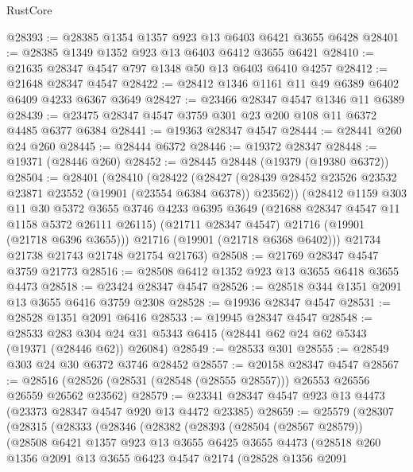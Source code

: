 \begin{lexlean}{RustCore}
\begin{coremodule}
@28393 := @28385 @1354 @1357 @923 @13 @6403 @6421 @3655 @6428
@28401 := @28385 @1349 @1352 @923 @13 @6403 @6412 @3655 @6421
@28410 := @21635 @28347 @4547 @797 @1348 @50 @13 @6403 @6410 @4257
@28412 := @21648 @28347 @4547
@28422 := @28412 @1346 @1161 @11 @49 @6389 @6402 @6409 @4233 @6367 @3649
@28427 := @23466 @28347 @4547 @1346 @11 @6389
@28439 := @23475 @28347 @4547 @3759 @301 @23 @200 @108 @11 @6372 @4485 @6377 @6384
@28441 := @19363 @28347 @4547
@28444 := @28441 @260 @24 @260
@28445 := @28444 @6372
@28446 := @19372 @28347
@28448 := @19371 (@28446 @260)
@28452 := @28445 @28448 (@19379 (@19380 @6372))
@28504 := @28401
    (@28410
      (@28422
        (@28427 (@28439 @28452 @23526 @23532 @23871 @23552 (@19901 (@23554 @6384 @6378)) @23562))
        (@28412
          @1159
          @303
          @11
          @30
          @5372
          @3655
          @3746
          @4233
          @6395
          @3649
          (@21688 @28347 @4547 @11 @1158 @5372 @26111 @26115)
          (@21711 @28347 @4547)
          @21716
          (@19901 (@21718 @6396 @3655)))
        @21716
        (@19901 (@21718 @6368 @6402)))
      @21734
      @21738
      @21743
      @21748
      @21754
      @21763)
@28508 := @21769 @28347 @4547 @3759 @21773
@28516 := @28508 @6412 @1352 @923 @13 @3655 @6418 @3655 @4473
@28518 := @23424 @28347 @4547
@28526 := @28518 @344 @1351 @2091 @13 @3655 @6416 @3759 @2308
@28528 := @19936 @28347 @4547
@28531 := @28528 @1351 @2091 @6416
@28533 := @19945 @28347 @4547
@28548 := @28533
    @283
    @304
    @24
    @31
    @5343
    @6415
    (@28441 @62 @24 @62 @5343 (@19371 (@28446 @62)) @26084)
@28549 := @28533 @301
@28555 := @28549 @303 @24 @30 @6372 @3746 @28452
@28557 := @20158 @28347 @4547
@28567 := @28516 (@28526 (@28531 (@28548 (@28555 @28557))) @26553 @26556 @26559 @26562 @23562)
@28579 := @23341 @28347 @4547 @923 @13 @4473 (@23373 @28347 @4547 @920 @13 @4472 @23385)
@28659 := @25579
    (@28307
      (@28315
        (@28333
          (@28346
            (@28382
              (@28393
                (@28504 (@28567 @28579))
                (@28508
                  @6421
                  @1357
                  @923
                  @13
                  @3655
                  @6425
                  @3655
                  @4473
                  (@28518
                    @260
                    @1356
                    @2091
                    @13
                    @3655
                    @6423
                    @4547
                    @2174
                    (@28528
                      @1356
                      @2091

\end{coremodule}
\end{lexlean}
